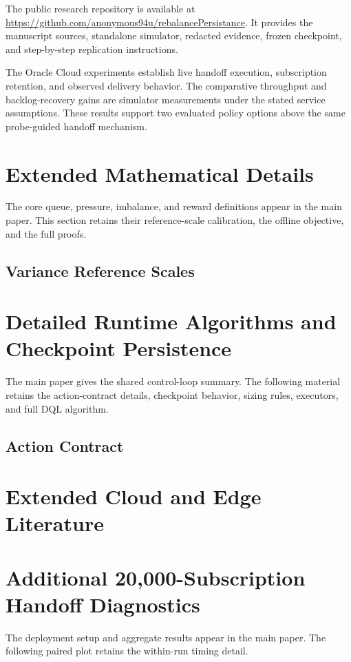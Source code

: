 
The public research repository is available at
\url{https://github.com/anonymous94u/rebalancePersistance}.
It provides the manuscript sources, standalone simulator, redacted evidence,
frozen checkpoint, and step-by-step replication instructions.

The Oracle Cloud experiments establish live handoff execution, subscription
retention, and observed delivery behavior. The comparative throughput and
backlog-recovery gains are simulator measurements under the stated service
assumptions. These results support two evaluated policy options above the same
probe-guided handoff mechanism.

\section{Extended Mathematical Details}
\label{app:extended-mathematics}
The core queue, pressure, imbalance, and reward definitions appear in the main
paper. This section retains their reference-scale calibration, the offline
objective, and the full proofs.
\subsection{Variance Reference Scales}

\section{Detailed Runtime Algorithms and Checkpoint Persistence}
\label{app:runtime-details}
The main paper gives the shared control-loop summary. The following material
retains the action-contract details, checkpoint behavior, sizing rules,
executors, and full DQL algorithm.
\subsection{Action Contract}

\section{Extended Cloud and Edge Literature}
\label{app:extended-literature}

\section{Additional 20,000-Subscription Handoff Diagnostics}
\label{app:cloud-timing}
The deployment setup and aggregate results appear in the main paper. The
following paired plot retains the within-run timing detail.

